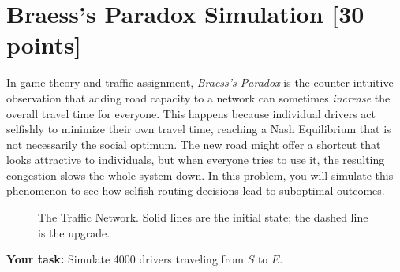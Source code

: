 \documentclass[11pt]{article}
\begin{document}
\section{Braess's Paradox Simulation [30 points]}

\noindent In game theory and traffic assignment, \textit{Braess's Paradox} is the counter-intuitive observation that adding road capacity to a network can sometimes \textit{increase} the overall travel time for everyone. This happens because individual drivers act selfishly to minimize their own travel time, reaching a Nash Equilibrium that is not necessarily the social optimum. The new road might offer a shortcut that looks attractive to individuals, but when everyone tries to use it, the resulting congestion slows the whole system down. In this problem, you will simulate this phenomenon to see how selfish routing decisions lead to suboptimal outcomes.

\begin{figure}[h]
    \centering
    \caption{The Traffic Network. Solid lines are the initial state; the dashed line is the upgrade.}
\end{figure}

\noindent \textbf{Your task:} Simulate 4000 drivers traveling from $S$ to $E$.
\end{document}
